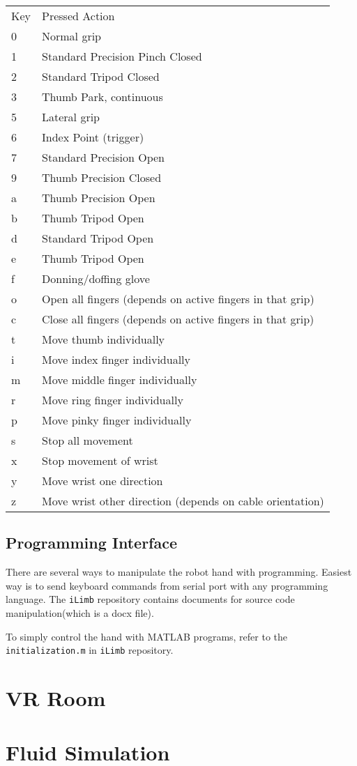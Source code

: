 \documentclass[11pt]{article}
\begin{document}
\begin{center}
\begin{tabular}{ll}
Key & Pressed Action\\
0 & Normal grip\\
1 & Standard Precision Pinch Closed\\
2 & Standard Tripod Closed\\
3 & Thumb Park, continuous\\
5 & Lateral grip\\
6 & Index Point (trigger)\\
7 & Standard Precision Open\\
9 & Thumb Precision Closed\\
a & Thumb Precision Open\\
b & Thumb Tripod Open\\
d & Standard Tripod Open\\
e & Thumb Tripod Open\\
f & Donning/doffing  glove\\
o & Open all fingers (depends on active fingers in that grip)\\
c & Close all fingers (depends on active fingers in that grip)\\
t & Move thumb individually\\
i & Move index finger individually\\
m & Move middle finger individually\\
r & Move ring finger individually\\
p & Move pinky finger individually\\
s & Stop all movement\\
x & Stop movement of wrist\\
y & Move wrist one direction\\
z & Move wrist other direction (depends on cable orientation)\\
\end{tabular}
\end{center}

\subsection{Programming Interface}
\label{sec:orgheadline4}
There are several ways to manipulate the robot hand with programming. Easiest way is to send keyboard commands from serial port with any programming language. The \texttt{iLimb} repository contains documents for source code manipulation(which is a docx file). 

To simply control the hand with MATLAB programs, refer to the \texttt{initialization.m} in \texttt{iLimb} repository.


\section{VR Room}
\label{sec:orgheadline6}

\section{Fluid Simulation}
\label{sec:orgheadline7}
\end{document}
